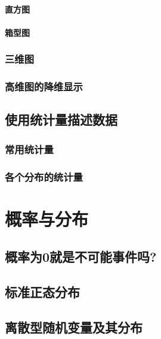 \documentclass[lang=cn,10pt]{elegantbook}
\begin{document}
\subsubsection{直方图}

\subsubsection{箱型图}


\subsection{三维图}


\subsection{高维图的降维显示}



\section{使用统计量描述数据}
\subsection{常用统计量}



\subsection{各个分布的统计量}






\chapter{概率与分布}
\section{概率为0就是不可能事件吗?}



\section{标准正态分布}



\section{离散型随机变量及其分布}
\end{document}
